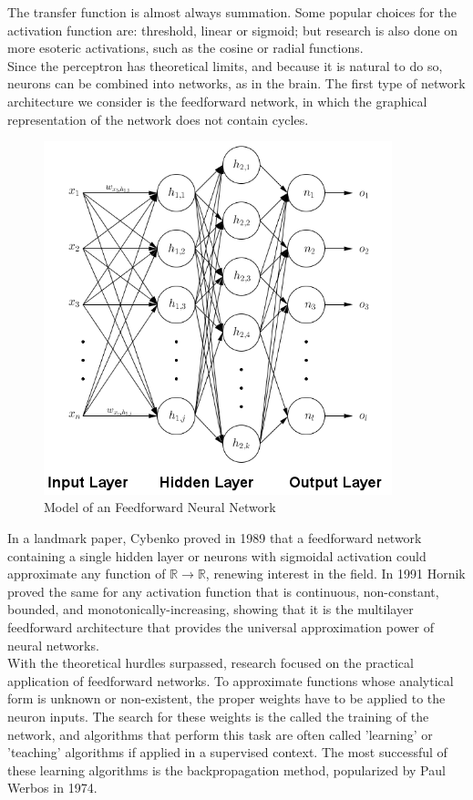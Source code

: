 \documentclass[12pt,oneside]{CUNY_CS_PhD}
\begin{document}
The transfer function is almost always summation. Some popular choices for the activation function are: threshold, linear or sigmoid; but research is also done on more esoteric activations, such as the cosine or radial functions.\\
Since the perceptron has theoretical limits, and because it is natural to do so, neurons can be combined into networks, as in the brain. The first type of network architecture we consider is the feedforward network, in which the graphical representation of the network does not contain cycles.\\
\begin{figure}[h]
\centering
\includegraphics[width=0.9\textwidth]{pictures/FeedForwardNeuralNetwork.png}
\caption{Model of an Feedforward Neural Network}
\label{fig:feedforward}
\end{figure}
In a landmark paper, Cybenko proved in 1989 that a feedforward network containing a single hidden layer or neurons with sigmoidal activation could approximate any function of $\mathbb{R} \rightarrow \mathbb{R}$, renewing interest in the field. In 1991 Hornik proved the same for any activation function that is continuous, non-constant, bounded, and monotonically-increasing, showing that it is the multilayer feedforward architecture that provides the universal approximation power of neural networks.\\
With the theoretical hurdles surpassed, research focused on the practical application of feedforward networks. To approximate functions whose analytical form is unknown or non-existent, the proper weights have to be applied to the neuron inputs. The search for these weights is the called the training of the network, and algorithms that perform this task are often called 'learning' or 'teaching' algorithms if applied in a supervised context. The most successful of these learning algorithms is the backpropagation method, popularized by Paul Werbos in 1974.\\
\end{document}
